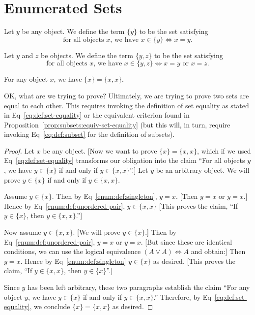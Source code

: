 \section{Enumerated Sets}

\begin{definition}
Let $y$ be any object. We define the term $\{y\}$ to be the set
satisfying
\begin{equation}\label{enum:def:singleton}
\mbox{for all objects $x$, we have }x\in\{y\}\iff x=y.
\end{equation}
\end{definition}

\begin{definition}
Let $y$ and $z$ be objects. We define the term $\{y,z\}$ to be the set
satisfying
\begin{equation}\label{enum:def:unordered-pair}
\mbox{for all objects $x$, we have }x\in\{y,z\}\iff x=y\mbox{ or }x=z.
\end{equation}
\end{definition}

\begin{proposition}
For any object $x$, we have $\{x\}=\{x,x\}$.
\end{proposition}

OK, what are we trying to prove? Ultimately, we are trying to prove two
sets are equal to each other. This requires invoking the definition of
set equality as stated in Eq~\eqref{eq:def:set-equality} or the
equivalent criterion found in
Proposition~\ref{prop:subsets:equiv-set-equality} (but this will, in
turn, require invoking Eq~\ref{eq:def:subset} for the definition of subsets).

\begin{proof}
Let $x$ be any object. [Now we want to prove $\{x\}=\{x,x\}$, which if
we used Eq~\eqref{eq:def:set-equality} transforms our obligation into
the claim ``For all objects $y$, we have $y\in\{x\}$ if and only if
$y\in\{x,x\}$''.]
Let $y$ be an arbitrary object. We will prove $y\in\{x\}$ if and only if
$y\in\{x,x\}$.

Assume $y\in\{x\}$. Then by Eq~\eqref{enum:def:singleton}, $y=x$. [Then
$y=x$ or $y=x$.] Hence by Eq~\eqref{enum:def:unordered-pair}, $y\in\{x,x\}$
[This proves the claim, ``If $y\in\{x\}$, then $y\in\{x,x\}$.'']

Now assume $y\in\{x,x\}$. [We will prove $y\in\{x\}$.]
Then by Eq~\eqref{enum:def:unordered-pair}, $y=x$ or $y=x$. [But since
these are identical conditions, we can use the logical equivalence
$(A\lor A)\iff A$ and obtain:] Then $y=x$. Hence by Eq~\eqref{enum:def:singleton}
$y\in\{x\}$ as desired. [This proves the claim, ``If $y\in\{x,x\}$,
then $y\in\{x\}$''.]

Since $y$ has been left arbitrary, these two paragraphs establish the
claim ``For any object $y$, we have $y\in\{x\}$ if and only if $y\in\{x,x\}$.''
Therefore, by Eq~\eqref{eq:def:set-equality}, we conclude $\{x\}=\{x,x\}$
as desired.
\end{proof}

